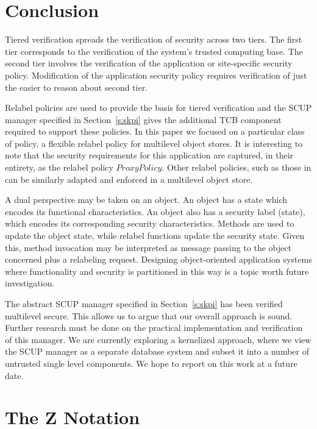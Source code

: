 \section{Conclusion}

Tiered verification spreads the verification of security across two
tiers. The first tier corresponds to the verification of the system's
trusted computing base. The second tier involves the verification of
the application or site-specific  security policy.  Modification of the
application security policy requires verification of just the easier to
reason about second tier.

Relabel policies are used to provide the basis for tiered verification
and the SCUP manager specified in Section~\ref{s:skpi} gives the
additional TCB component required to support these policies.  In this
paper we focused on a particular class of policy, a flexible relabel
policy for multilevel object stores.  It is interesting to note that
the security requirements for this application are captured, in their
entirety, as the relabel policy $ProxyPolicy$.  Other relabel policies,
such as those in  \cite{FGQ:oak:96} can be similarly adapted and 
enforced in a multilevel object store.

A dual perspective may be taken on an object. An object has a state
which encodes its functional characteristics. An object also has a
security label (state), which encodes its corresponding security
characteristics. Methods are used to update the object state, while
relabel functions  update the security state. Given this, method
invocation may be interpreted as message passing to the object
concerned plus a relabeling request. Designing object-oriented
application systems where functionality and security is partitioned 
in this way is a topic worth future investigation.

The abstract SCUP manager specified in Section~\ref{s:skpi} has been
verified multilevel secure. This allows us to argue that our overall
approach is sound. Further research must be done on the practical
implementation and verification of this manager.  We are currently
exploring a kernelized approach, where we view the SCUP manager as a
separate database system and subset it into a number of untrusted
single level components.  We hope to report on this work at a future
date.






\appendix
\section{The Z Notation} \label{s:z}

